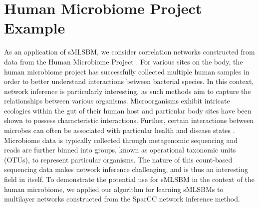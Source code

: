 {\begin{figure}
\begin{center}
\end{center}
\end{figure}

\section{Human Microbiome Project Example}
\indent As an application of sMLSBM, we consider correlation networks constructed from data from the Human Microbiome Project \cite{microbiome}. For various sites on the body, the human microbiome project has successfully collected multiple human samples in order to better understand interactions between bacterial species. In this context, network inference is particularly interesting, as such methods aim to capture the relationships between various organisms. Microorganisms exhibit intricate ecologies within the gut of their human host and particular body sites have been shown to possess characteristic interactions. Further, certain interactions between microbes can often be associated with particular health and disease states \cite{microbeco}. Microbiome data is typically collected through metagenomic sequencing and reads are further binned into groups, known as operational taxonomic units (OTUs), to represent particular organisms. The nature of this count-based sequencing data makes network inference challenging, and is thus an interesting field in itself. To demonstrate the potential use for sMLSBM in the context of the human microbiome, we applied our algorithm for learning sMLSBMs to multilayer networks constructed from the SparCC \cite{sparcc} network inference method. \\
}
